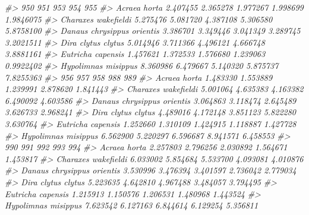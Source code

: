 \documentclass[
]{article}
\newenvironment{Shaded}{\begin{snugshade}}{\end{snugshade}}
\newcommand{\CommentTok}[1]{\textcolor[rgb]{0.56,0.35,0.01}{\textit{#1}}}
\begin{document}
\begin{Shaded}
\begin{Highlighting}[]
\CommentTok{\#\textgreater{}                                 950      951      953      954       955}
\CommentTok{\#\textgreater{} Acraea horta               2.407455 2.365278 1.977267 1.998699 1.9846075}
\CommentTok{\#\textgreater{} Charaxes wakefieldi        5.275476 5.081720 4.387108 5.306580 5.8758100}
\CommentTok{\#\textgreater{} Danaus chrysippus orientis 3.386701 3.349446 3.041349 3.289745 3.2021511}
\CommentTok{\#\textgreater{} Dira clytus clytus         5.014946 3.711366 4.496121 4.666748 3.8881161}
\CommentTok{\#\textgreater{} Eutricha capensis          1.457621 1.372533 1.576680 1.239063 0.9922402}
\CommentTok{\#\textgreater{} Hypolimnas misippus        8.360986 6.479667 5.140320 5.875737 7.8255363}
\CommentTok{\#\textgreater{}                                 956      957      958      988      989}
\CommentTok{\#\textgreater{} Acraea horta               1.483330 1.553889 1.239991 2.878620 1.841443}
\CommentTok{\#\textgreater{} Charaxes wakefieldi        5.001064 4.635383 4.163382 6.490092 4.603586}
\CommentTok{\#\textgreater{} Danaus chrysippus orientis 3.064863 3.118474 2.645489 3.626733 2.968241}
\CommentTok{\#\textgreater{} Dira clytus clytus         4.489016 4.172148 3.851123 5.822280 3.630764}
\CommentTok{\#\textgreater{} Eutricha capensis          1.252660 1.310109 1.424915 1.118887 1.427728}
\CommentTok{\#\textgreater{} Hypolimnas misippus        6.562900 5.220297 6.596687 8.941571 6.458553}
\CommentTok{\#\textgreater{}                                 990      991      992      993      994}
\CommentTok{\#\textgreater{} Acraea horta               2.257803 2.796256 2.030892 1.564671 1.453817}
\CommentTok{\#\textgreater{} Charaxes wakefieldi        6.033002 5.854684 5.533700 4.093081 4.010876}
\CommentTok{\#\textgreater{} Danaus chrysippus orientis 3.530996 3.476394 3.401597 2.736042 2.779034}
\CommentTok{\#\textgreater{} Dira clytus clytus         5.223635 4.642810 4.967488 3.484057 3.794495}
\CommentTok{\#\textgreater{} Eutricha capensis          1.215913 1.150576 1.206531 1.480968 1.443524}
\CommentTok{\#\textgreater{} Hypolimnas misippus        7.623542 6.127163 6.844614 6.129254 5.356811}


\end{Highlighting}
\end{Shaded}
\end{document}
